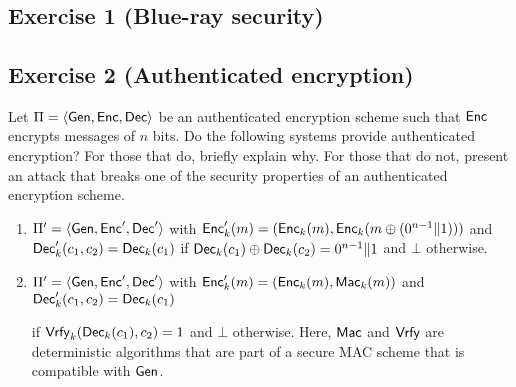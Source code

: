 \section{}
\subsection{Exercise 1 (Blue-ray security)}

\subsection{Exercise 2 (Authenticated encryption)}
Let $\Pi = \langle \Gen, \Enc, \Dec\rangle$ be an authenticated encryption
scheme such that $\Enc$ encrypts messages of $n$ bits.
%
Do the following systems provide authenticated encryption?  For those
that do, briefly explain why.  For those that do not, present an
attack that breaks one of the security properties of an authenticated
encryption scheme.

\begin{enumerate}
	\item $\Pi' = \langle \Gen, \Enc', \Dec'\rangle$ with
	$\Enc'_k(m) = (\Enc_k(m), \Enc_k(m \oplus (0^{n-1}\|1)))$ and
	$\Dec'_k(c_1, c_2) = \Dec_k(c_1)$ if
	$\Dec_k(c_1) \oplus \Dec_k(c_2) = 0^{n-1}\|1$ and $\bot$ otherwise.

	\item $\Pi' = \langle \Gen, \Enc', \Dec'\rangle$ with
	$\Enc'_k(m) = (\Enc_k(m), \Mac_k(m))$ and $\Dec'_k(c_1, c_2) = \Dec_k(c_1)$
	
	if $\Vrfy_k(\Dec_k(c_1), c_2)=1$ and $\bot$ otherwise. Here, $\Mac$
	and $\Vrfy$ are deterministic algorithms that are part of a secure
	MAC scheme that is compatible with $\Gen$.

\end{enumerate}

